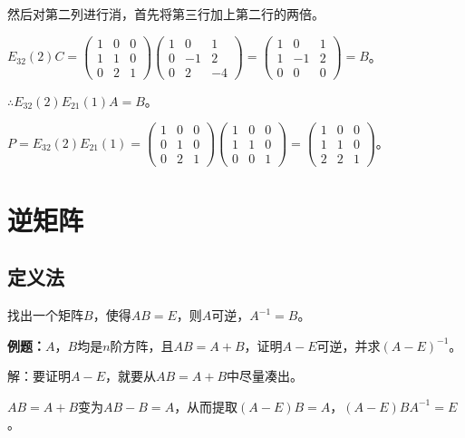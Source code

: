 \documentclass[UTF8, 12pt]{ctexart}
\begin{document}
然后对第二列进行消，首先将第三行加上第二行的两倍。

$E_{32}(2)C=\left(\begin{array}{ccc}
    1 & 0 & 0 \\
    1 & 1 & 0 \\
    0 & 2 & 1
\end{array}\right)\left(\begin{array}{ccc}
    1 & 0 & 1 \\
    0 & -1 & 2 \\
    0 & 2 & -4
\end{array}\right)=\left(\begin{array}{ccc}
    1 & 0 & 1 \\
    1 & -1 & 2 \\
    0 & 0 & 0
\end{array}\right)=B$。\medskip

$\therefore E_{32}(2)E_{21}(1)A=B$。

$P=E_{32}(2)E_{21}(1)=\left(\begin{array}{ccc}
    1 & 0 & 0 \\
    0 & 1 & 0 \\
    0 & 2 & 1
\end{array}\right)\left(\begin{array}{ccc}
    1 & 0 & 0 \\
    1 & 1 & 0 \\
    0 & 0 & 1
\end{array}\right)=\left(\begin{array}{ccc}
    1 & 0 & 0 \\
    1 & 1 & 0 \\
    2 & 2 & 1
\end{array}\right)$。

\section{逆矩阵}

\subsection{定义法}

找出一个矩阵$B$，使得$AB=E$，则$A$可逆，$A^{-1}=B$。

\textbf{例题：}$A$，$B$均是$n$阶方阵，且$AB=A+B$，证明$A-E$可逆，并求$(A-E)^{-1}$。

解：要证明$A-E$，就要从$AB=A+B$中尽量凑出。

$AB=A+B$变为$AB-B=A$，从而提取$(A-E)B=A$，$(A-E)BA^{-1}=E$。
\end{document}
